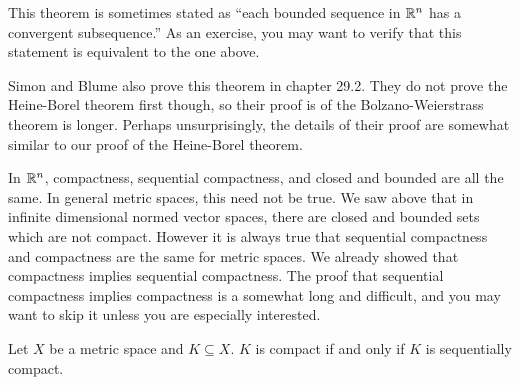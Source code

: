 \begin{remark}
  This theorem is sometimes stated as ``each bounded sequence in $\mathbb{R}^n$
  has a convergent subsequence.'' As an exercise, you may want to
  verify that this statement is equivalent to the one above.
\end{remark}
Simon and Blume also prove this theorem in chapter 29.2. They do not
prove the Heine-Borel theorem first though, so their proof is of the
Bolzano-Weierstrass theorem is longer. Perhaps unsurprisingly, the
details of their proof are somewhat similar to our proof of the
Heine-Borel theorem.

In $\mathbb{R}^n$, compactness, sequential compactness, and closed and bounded
are all the same. In general metric spaces, this need not be true. We
saw above that in infinite dimensional normed vector spaces, there are
closed and bounded sets which are not compact.  However it is always
true that sequential compactness and compactness are the same for
metric spaces. We already showed that compactness implies sequential
compactness.  The proof that sequential compactness implies
compactness is a somewhat long and difficult, and you may want to skip
it unless you are especially interested.
\begin{theorem}
  Let $X$ be a metric space and $K \subseteq X$. $K$ is compact if and
  only if $K$ is sequentially compact. 
\end{theorem}
